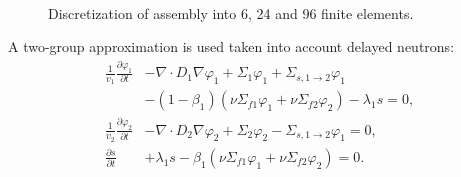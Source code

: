 \documentclass[authoryear]{elsarticle}
\begin{document}
\begin{figure}[!h]
\begin{center}
\begin{minipage}{0.30\linewidth}
\end{minipage}
\hfill
\begin{minipage}{0.30\linewidth}
\\
\end{minipage}
\caption{Discretization of assembly into 6, 24 and 96 finite elements.}
\label{fig:3}
  \end{center}
\end{figure}

A two-group approximation is used taken into account delayed neutrons: 
\begin{equation}\label{22}
\begin{split}
 \frac{1}{v_1}  \frac{\partial \varphi_1}{\partial t}  
 & - \nabla \cdot D_1 \nabla \varphi_1  + \Sigma_1 \varphi_1 + \Sigma_{s,1\rightarrow 2} \varphi_1  \\
 & - (1 - \beta_1)(\nu \Sigma_{f1} \varphi_1 + \nu \Sigma_{f2} \varphi_2) - \lambda_1 s = 0, \\
 \frac{1}{v_2}  \frac{\partial \varphi_2}{\partial t}  
 & - \nabla \cdot D_2 \nabla \varphi_2  + \Sigma_2 \varphi_2 - \Sigma_{s,1\rightarrow 2} \varphi_1   = 0,\\
 \frac{\partial s}{\partial t} & + \lambda_1 s - \beta_1(\nu \Sigma_{f1} \varphi_1 + \nu \Sigma_{f2} \varphi_2) = 0. 
\end{split}
\end{equation} 
\end{document}
